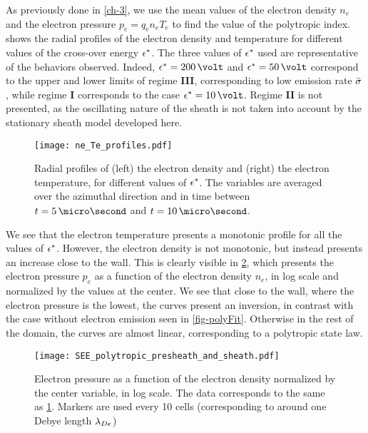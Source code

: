 As previously done in \cref{ch-3}, we use the mean values of the electron density $n_e$ and the electron pressure $ p_e = q_e n_e T_e$ to find the value of the polytropic index.
 shows the radial profiles of the electron density and temperature for different values of the cross-over energy $\epsilon^{*}$.
The three values of $\epsilon^{*}$ used are representative of the behaviors observed.
Indeed, $\crover=200\,\volt$ and $\crover=50\,\volt$ correspond to the upper and lower limits of regime {\bf III}, corresponding to low emission rate $ \bar{\sigma }$, while regime {\bf I} corresponds to the case $\crover=10\,\volt$.
Regime {\bf II} is not presented, as the oscillating nature of the sheath is not taken into account by the stationary sheath model developed here. 


\begin{figure}[!htb]
  \centering
  \texttt{[image: ne\_Te\_profiles.pdf]}
  \caption{Radial profiles of (left) the electron density and (right) the electron temperature, for different values of $\epsilon^{*}$. The variables are averaged over the azimuthal direction and in time between $t=5\,\micro\second$ and $t=10\,\micro\second$.  }
  \label{fig-radial_profiles_see}
\end{figure}

We see that the electron temperature presents a monotonic profile for all the values of $\epsilon^{*}$.
However, the electron density is not monotonic, but instead presents an increase close to the wall.
This is clearly visible in \cref{fig-log_pe-ne}, which presents the electron pressure $p_e$ as a function of the electron density $n_e$, in log scale and normalized by the values at the center.
We see that close to the wall, where the electron pressure is the lowest, the curves present an inversion, in contrast with the case without electron emission seen in \cref{fig-polyFit}.
Otherwise in the rest of the domain, the curves are almost linear, corresponding to a polytropic state law.

\begin{figure}[!htb]
  \centering
  \texttt{[image: SEE\_polytropic\_presheath\_and\_sheath.pdf]}
  \caption{Electron pressure as a function of the electron density normalized by the center variable, in log scale. The data corresponds to the same as \cref{fig-radial_profiles_see}. Markers are used every 10 cells (corresponding to around one Debye length $\lambda_{De}$)}
  \label{fig-log_pe-ne}
\end{figure}

